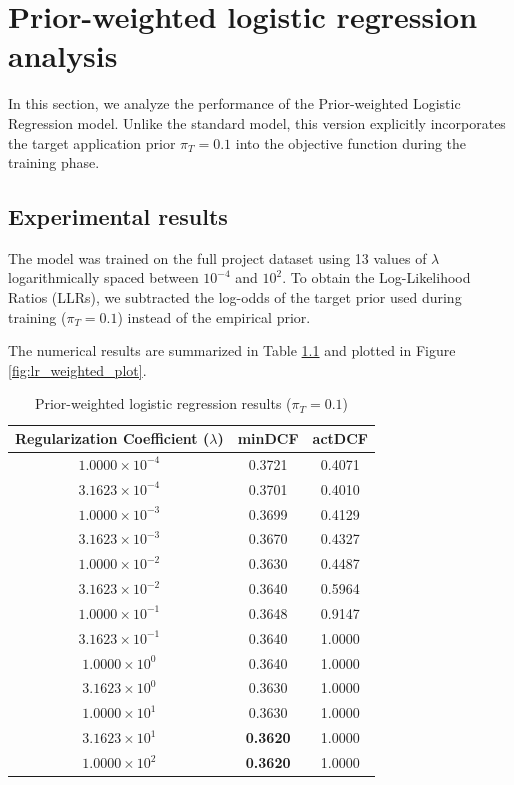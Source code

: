 \chapter{Prior-weighted logistic regression analysis}

In this section, we analyze the performance of the Prior-weighted Logistic Regression model. Unlike the standard model, this version explicitly incorporates the target application prior $\pi_T = 0.1$ into the objective function during the training phase. 

\section{Experimental results}

The model was trained on the full project dataset using 13 values of $\lambda$ logarithmically spaced between $10^{-4}$ and $10^{2}$. To obtain the Log-Likelihood Ratios (LLRs), we subtracted the log-odds of the target prior used during training ($\pi_T = 0.1$) instead of the empirical prior.

The numerical results are summarized in Table \ref{tab:weighted_lr_results} and plotted in Figure \ref{fig:lr_weighted_plot}.

\begin{table}[h]
\centering
\caption{Prior-weighted logistic regression results ($\pi_T = 0.1$)}
\label{tab:weighted_lr_results}
\begin{tabular}{@{}ccc@{}}
\toprule
\textbf{Regularization Coefficient ($\lambda$)} & \textbf{minDCF} & \textbf{actDCF} \\ \midrule
$1.0000 \times 10^{-4}$ & 0.3721 & 0.4071 \\
$3.1623 \times 10^{-4}$ & 0.3701 & 0.4010 \\
$1.0000 \times 10^{-3}$ & 0.3699 & 0.4129 \\
$3.1623 \times 10^{-3}$ & 0.3670 & 0.4327 \\
$1.0000 \times 10^{-2}$ & 0.3630 & 0.4487 \\
$3.1623 \times 10^{-2}$ & 0.3640 & 0.5964 \\
$1.0000 \times 10^{-1}$ & 0.3648 & 0.9147 \\
$3.1623 \times 10^{-1}$ & 0.3640 & 1.0000 \\
$1.0000 \times 10^{0}$  & 0.3640 & 1.0000 \\
$3.1623 \times 10^{0}$  & 0.3630 & 1.0000 \\
$1.0000 \times 10^{1}$  & 0.3630 & 1.0000 \\
$3.1623 \times 10^{1}$  & \textbf{0.3620} & 1.0000 \\
$1.0000 \times 10^{2}$  & \textbf{0.3620} & 1.0000 \\
\bottomrule
\end{tabular}
\end{table}

